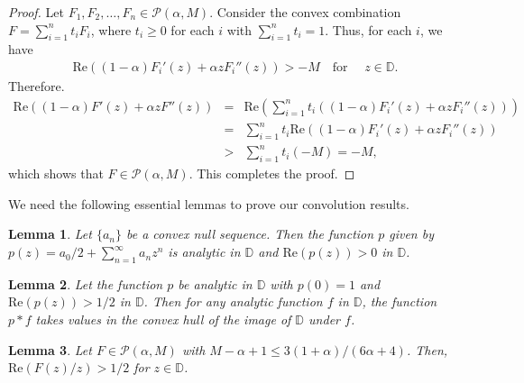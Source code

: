 \documentclass[11pt,reqno]{amsart}
\newtheorem{lem}{Lemma}[section]
\newtheorem{open problem}{Open problem}[section]
\newcommand{\beas}{\begin{eqnarray*}}
\newcommand{\eeas}{\end{eqnarray*}}
\numberwithin{equation}{section}
\begin{document}
\begin{proof}
Let $F_1, F_2, \ldots, F_n \in \mathcal{P}(\alpha, M)$. Consider the convex combination $F=\sum_{i=1}^n t_i F_i$, where $t_i\geq 0$ for each $i$ with $\sum_{i=1}^n t_i=1$.
Thus, for each $i$, we have
\beas \text{Re}\left((1-\alpha)F_i'(z) + \alpha z F_i''(z)\right) > -M \quad \text{for }\quad z \in \mathbb{D}.\eeas
Therefore.
\beas
\text{Re}\left((1-\alpha)F'(z) + \alpha z F''(z)\right)
&= & \text{Re}\left(\sum_{i=1}^n t_i \left((1-\alpha)F_i'(z) + \alpha z F_i''(z)\right)\right) \\[1mm]
&=& \sum_{i=1}^n t_i  \text{Re}\left((1-\alpha)F_i'(z) + \alpha z F_i''(z)\right) \\[1mm]
&>& \sum_{i=1}^n t_i (-M) = -M,
\eeas
which shows that $F \in \mathcal{P}(\alpha, M)$. This completes the proof.
\end{proof}
\noindent We need the following essential lemmas to prove our convolution results.
\begin{lem}\label{lem2}\cite{SS1989} Let $\{a_n\}$ be a convex null sequence. Then the function $p$ given by $p(z)=a_0/2+\sum_{n=1}^{\infty} a_nz^n$ is analytic in 
$\mathbb{D}$ and $\text{Re}(p(z))>0$ in $\mathbb{D}$. \end{lem}
\begin{lem}\label{lem3}\cite{SS1989} Let the function $p$ be analytic in $\mathbb{D}$ with $p(0)=1$ and $\text{Re}(p(z))>1/2$ in $\mathbb{D}$. Then for any analytic function $f$ 
in $\mathbb{D}$, the function $p*f$ takes values in the convex hull of the image of $\mathbb{D}$ under $f$. \end{lem}
\begin{lem}\label{lem4} Let $F\in\mathcal{P}(\alpha, M)$ with $M-\alpha+1\leq 3(1+\alpha)/(6\alpha+4)$. Then, $\text{Re}\left(F(z)/z\right)>1/2$ for $z\in\mathbb{D}$.\end{lem}
\end{document}
